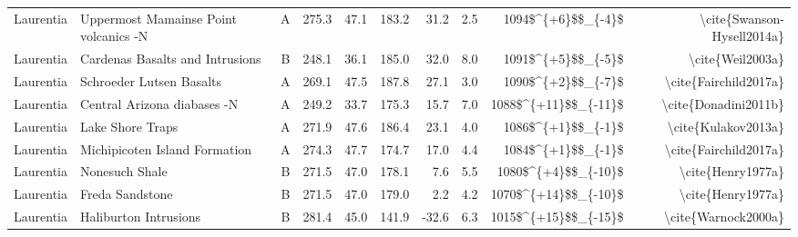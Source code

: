 \begin{longtable}{p{1 in}p{1 in}rrrrrrrr}
                     Laurentia &            Uppermost Mamainse Point volcanics -N &      A &     275.3 &      47.1 & 183.2 &  31.2 &       2.5 &     1094\$\textasciicircum \{+6\}\$\$\_\{-4\}\$ &                         \textbackslash cite\{Swanson-Hysell2014a\} \\
                     Laurentia &                  Cardenas Basalts and Intrusions &      B &     248.1 &      36.1 & 185.0 &  32.0 &       8.0 &     1091\$\textasciicircum \{+5\}\$\$\_\{-5\}\$ &                                   \textbackslash cite\{Weil2003a\} \\
                     Laurentia &                         Schroeder Lutsen Basalts &      A &     269.1 &      47.5 & 187.8 &  27.1 &       3.0 &     1090\$\textasciicircum \{+2\}\$\$\_\{-7\}\$ &                              \textbackslash cite\{Fairchild2017a\} \\
                     Laurentia &                      Central Arizona diabases -N &      A &     249.2 &      33.7 & 175.3 &  15.7 &       7.0 &   1088\$\textasciicircum \{+11\}\$\$\_\{-11\}\$ &                               \textbackslash cite\{Donadini2011b\} \\
                     Laurentia &                                 Lake Shore Traps &      A &     271.9 &      47.6 & 186.4 &  23.1 &       4.0 &     1086\$\textasciicircum \{+1\}\$\$\_\{-1\}\$ &                                \textbackslash cite\{Kulakov2013a\} \\
                     Laurentia &                    Michipicoten Island Formation &      A &     274.3 &      47.7 & 174.7 &  17.0 &       4.4 &     1084\$\textasciicircum \{+1\}\$\$\_\{-1\}\$ &                              \textbackslash cite\{Fairchild2017a\} \\
                     Laurentia &                                   Nonesuch Shale &      B &     271.5 &      47.0 & 178.1 &   7.6 &       5.5 &    1080\$\textasciicircum \{+4\}\$\$\_\{-10\}\$ &                                  \textbackslash cite\{Henry1977a\} \\
                     Laurentia &                                  Freda Sandstone &      B &     271.5 &      47.0 & 179.0 &   2.2 &       4.2 &   1070\$\textasciicircum \{+14\}\$\$\_\{-10\}\$ &                                  \textbackslash cite\{Henry1977a\} \\
                     Laurentia &                            Haliburton Intrusions &      B &     281.4 &      45.0 & 141.9 & -32.6 &       6.3 &   1015\$\textasciicircum \{+15\}\$\$\_\{-15\}\$ &                                \textbackslash cite\{Warnock2000a\} \\

\end{longtable}
